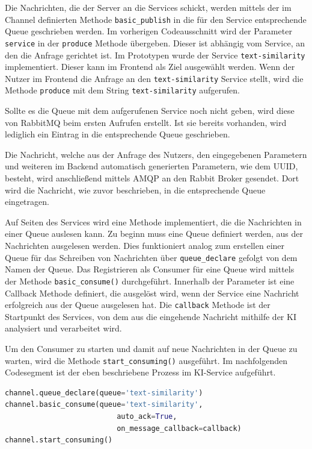 Die Nachrichten, die der Server an die Services schickt, werden mittels der im Channel definierten Methode \texttt{basic\_{}publish} in die für den Service entsprechende Queue geschrieben werden. Im vorherigen Codeausschnitt wird der Parameter \texttt{service} in der \texttt{produce} Methode übergeben. Dieser ist abhängig vom Service, an den die Anfrage gerichtet ist. Im Prototypen wurde der Service \texttt{text-similarity} implementiert. Dieser kann im Frontend als Ziel ausgewählt werden. Wenn der Nutzer im Frontend die Anfrage an den \texttt{text-similarity} Service stellt, wird die Methode \texttt{produce} mit dem String \texttt{\glqq text-similarity\grqq{}} aufgerufen.

Sollte es die Queue mit dem aufgerufenen Service noch nicht geben, wird diese von RabbitMQ beim ersten Aufrufen erstellt. Ist sie bereits vorhanden, wird lediglich ein Eintrag in die entsprechende Queue geschrieben.

Die Nachricht, welche aus der Anfrage des Nutzers, den eingegebenen Parametern und weiteren im Backend automatisch generierten Parametern, wie dem UUID, besteht, wird anschließend mittels AMQP an den Rabbit Broker gesendet. Dort wird die Nachricht, wie zuvor beschrieben, in die entsprechende Queue eingetragen. 

Auf Seiten des Services wird eine Methode implementiert, die die Nachrichten in einer Queue auslesen kann. Zu beginn muss eine Queue definiert werden, aus der Nachrichten ausgelesen werden. Dies funktioniert analog zum erstellen einer Queue für das Schreiben von Nachrichten über \texttt{queue\_{}declare} gefolgt von dem Namen der Queue. Das Registrieren als Consumer für eine Queue wird mittels der Methode \texttt{basic\_{}consume()} durchgeführt. Innerhalb der Parameter ist eine Callback Methode definiert, die ausgelöst wird, wenn der Service eine Nachricht erfolgreich aus der Queue ausgelesen hat. Die \texttt{callback} Methode ist der Startpunkt des Services, von dem aus die eingehende Nachricht mithilfe der KI analysiert und verarbeitet wird.

Um den Consumer zu starten und damit auf neue Nachrichten in der Queue zu warten, wird die Methode \texttt{start\_{}consuming()} ausgeführt. Im nachfolgenden Codesegment ist der eben beschriebene Prozess im KI-Service aufgeführt.

\begin{lstlisting}[language=Python]
channel.queue_declare(queue='text-similarity')
channel.basic_consume(queue='text-similarity',
                          auto_ack=True,
                          on_message_callback=callback)
channel.start_consuming()
\end{lstlisting}

